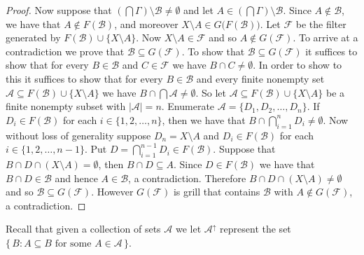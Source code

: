 \documentclass[12pt]{article}
\theoremstyle{plain}
\theoremstyle{definition}
\newcommand{\calA}{\mathcal{A}}
\newcommand{\calB}{\mathcal{B}}
\newcommand{\calF}{\mathcal{F}}
\begin{document}
\begin{proof}
  Now suppose that $(\bigcap\Gamma) \setminus \calB \ne \emptyset$ and let $A \in (\bigcap\Gamma) \setminus \calB$.
  Since $A \not\in \calB$, we have that $A \not\in F(\calB)$, and moreover $X \setminus A \in G\bigl(F(\calB)\bigr)$.
  Let $\calF$ be the filter generated by $F(\calB) \cup \{X \setminus A\}$. 
  Now $X \setminus A \in \calF$ and so $A \not\in G(\calF)$. 
  To arrive at a contradiction we prove that $\calB \subseteq G(\calF)$.
  To show that $\calB \subseteq G(\calF)$ it suffices to show that for every $B \in \calB$ and $C \in \calF$ we have $B \cap C \ne \emptyset$.
  In order to show to this it suffices to show that for every $B \in \calB$ and every finite nonempty set $\calA \subseteq F(\calB) \cup \{X \setminus A\}$ we have $B \cap \bigcap\calA \ne \emptyset$.
  So let $\calA \subseteq F(\calB) \cup \{X \setminus A\}$ be a finite nonempty subset with $|\calA| = n$.
  Enumerate $\calA = \{D_1, D_2, \ldots, D_n\}$.
  If $D_i \in F(\calB)$ for each $i \in \{1, 2, \ldots, n\}$, then we have that $B \cap \bigcap_{i=1}^n D_i \ne \emptyset$. 
  Now without loss of generality suppose $D_n = X \setminus A$ and $D_i \in F(\calB)$ for each $i \in \{1, 2, \ldots, n-1\}$. 
  Put $D = \bigcap_{i=1}^{n-1} D_i \in F(\calB)$.
  Suppose that $B \cap D \cap (X \setminus A) = \emptyset$, then $B \cap D \subseteq A$.
  Since $D \in F(\calB)$ we have that $B \cap D \in \calB$ and hence $A \in \calB$, a contradiction.
  Therefore $B \cap D \cap (X \setminus A) \ne \emptyset$ and so $\calB \subseteq G(\calF)$.
  However $G(\calF)$ is grill that contains $\calB$ with $A \not\in G(\calF)$, a contradiction. 
\end{proof}

Recall that given a collection of sets $\calA$ we let $\calA^\uparrow$ represent the set $\{\, B : \mbox{$A \subseteq B$ for some $A \in \calA$} \,\}$.
\end{document}
